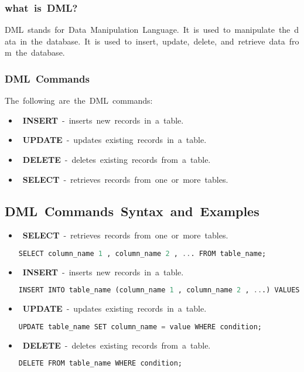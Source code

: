 \documentclass{article}
\begin{document}
	\subsubsection{\textbf{what is DML?}} 
	DML stands for Data Manipulation Language. It is used to manipulate the data in the database. It is used to insert, update, delete, and retrieve data from the database. 
	\subsubsection{\textbf{DML Commands}} 
	The following are the DML commands:  
	\begin{itemize} 
		\item \textbf{INSERT} - inserts new records in a table. 
		\item \textbf{UPDATE} - updates existing records in a table. 
		\item \textbf{DELETE} - deletes existing records from a table. 
		\item \textbf{SELECT} - retrieves records from one or more tables. 
	\end{itemize} 
	
	\subsection{\textbf{DML Commands Syntax and Examples}} 
	\begin{itemize} 
		\item \textbf{SELECT} - retrieves records from one or more tables. 
		\begin{lstlisting}[language=SQL] 
			SELECT column_name 1 , column_name 2 , ... FROM table_name; 
		\end{lstlisting} 
		\item \textbf{INSERT} - inserts new records in a table. 
		\begin{lstlisting}[language=SQL] 
			INSERT INTO table_name (column_name 1 , column_name 2 , ...) VALUES (value 1 , value 2 , ...); 
		\end{lstlisting} 
		\item \textbf{UPDATE} - updates existing records in a table. 
		\begin{lstlisting}[language=SQL] 
			UPDATE table_name SET column_name = value WHERE condition; 
		\end{lstlisting} 
		\item \textbf{DELETE} - deletes existing records from a table. 
		\begin{lstlisting}[language=SQL] 
			DELETE FROM table_name WHERE condition; 
		\end{lstlisting} 
	\end{itemize} 
	
\end{document}
